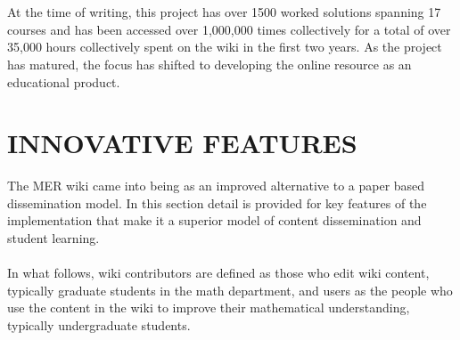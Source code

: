 \documentclass{primus}
\begin{document}
\\\\
\noindent{}At the time of writing, this project has over 1500 worked solutions spanning 17 courses and has been accessed over 1,000,000 times collectively for a total of over 35,000 hours collectively spent on the wiki in the first two years. As the project has matured, the  focus has shifted to developing the online resource as an educational product.

\section{INNOVATIVE FEATURES}\label{sec:Innovative_Features}
The MER wiki came into being as an improved alternative to a paper based dissemination model. In this section detail is provided for key features of the implementation that make it a superior model of content dissemination and student learning.
\\\\
\noindent{}In what follows, wiki contributors are defined as those who edit wiki content, typically graduate students in the math department, and users as the people who use the content in the wiki to improve their mathematical understanding, typically undergraduate students.
\end{document}

